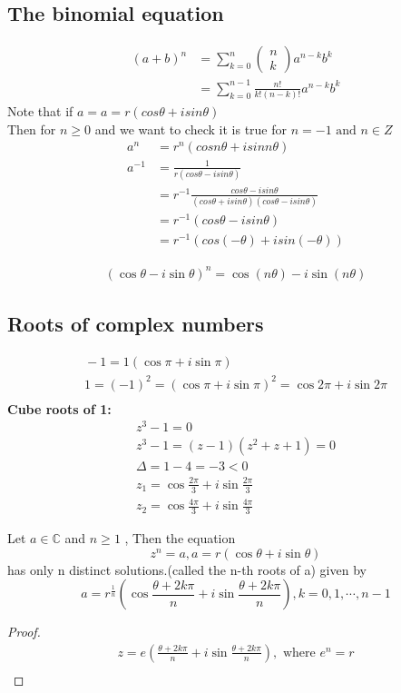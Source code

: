\subsection{The binomial equation}
\begin{align*}{}{}
(a+b)^n&=\sum_{k=0}^{n}\begin{pmatrix}n\\k\end{pmatrix}a^{n-k}b^k\\
&=\sum_{k=0}^{n-1}\frac{n!}{k!(n-k)!}a^{n-k}b^k
\end{align*}
Note that if $a=a=r(cos\theta+isin\theta)$\\
Then for $ n\geq0 $ and we want to check it is true for $ n=-1 \text{ and } n\in Z$
\begin{align*}{}{}
a^n&=r^n(cosn\theta+isinn\theta)\\
a^{-1}&=\frac{1}{r(cos\theta-isin\theta)}\\
&=r^{-1}\frac{cos\theta-isin\theta}{(cos\theta+isin\theta)(cos\theta-isin\theta)}\\
&=r^{-1}(cos\theta-isin\theta)\\
&=r^{-1}(cos(-\theta)+isin(-\theta))
\end{align*}
\begin{lemma}[de Maivre]{}
\begin{align*}{}{}
    {(\cos\theta-i\sin\theta)}^n=\cos(n\theta)-i\sin(n\theta)
\end{align*}
\end{lemma}
\subsection{Roots of complex numbers}
\begin{align*}{}{}
-1=1(\cos\pi+i\sin\pi)\\
1=(-1)^2=(\cos\pi+i\sin\pi)^2=\cos2\pi+i\sin2\pi\\
\end{align*}
\textbf{Cube roots of 1:}
\begin{align*}{}{}
z^3-1=0\\
z^3-1=(z-1)(z^2+z+1)=0\\
\Delta=1-4=-3<0\\
z_1=\cos\frac{2\pi}{3}+i\sin\frac{2\pi}{3}\\
z_2=\cos\frac{4\pi}{3}+i\sin\frac{4\pi}{3}
\end{align*}
\begin{lemma}[]{}
Let $ a\in \mathbb{C} $ and $ n\geq1 $ , Then the equation$$
    z^n=a,a=r(\cos\theta+i\sin\theta)
$$ has only n distinct solutions.(called the n-th roots of a) given by
$$
    a=r^{\frac{1}{n}}(\cos\frac{\theta+2k\pi}{n}+i\sin\frac{\theta+2k\pi}{n}),k=0,1,\cdots,n-1
$$ 
\end{lemma}
\begin{proof}
    \begin{align*}{}{}
    z=e(\frac{\theta+2k\pi}{n}+i\sin\frac{\theta+2k\pi}{n}),\text{ where } e^n=r\\
    \end{align*}
\end{proof}
